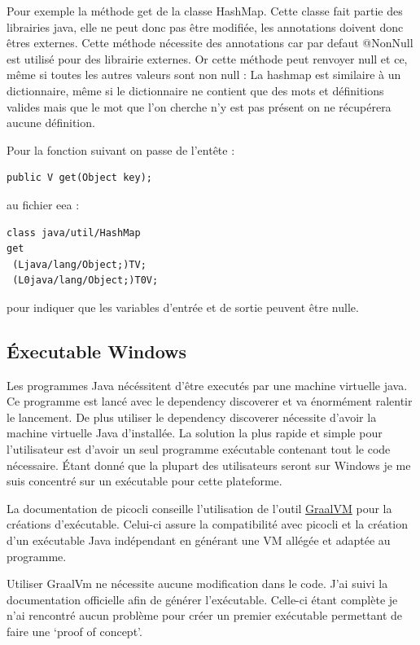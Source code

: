 \documentclass[french,a4paper,12pt]{report}
\begin{document}
Pour exemple la méthode get de la classe HashMap. Cette classe fait partie des librairies java, elle ne peut donc pas être modifiée, les annotations doivent donc êtres externes. Cette méthode nécessite des annotations car par defaut @NonNull est utilisé pour des librairie externes. Or cette méthode peut renvoyer null et ce, même si toutes les autres valeurs sont non null : La hashmap est similaire à un dictionnaire, même si le dictionnaire ne contient que des mots et définitions valides mais que le mot que l'on cherche n'y est pas présent on ne récupérera aucune définition.

Pour la fonction suivant on passe de l’entête :
\begin{lstlisting}
public V get(Object key);
\end{lstlisting}

au fichier eea :

\begin{verbatim}
class java/util/HashMap
get
 (Ljava/lang/Object;)TV;
 (L0java/lang/Object;)T0V;
\end{verbatim}

pour indiquer que les variables d'entrée et de sortie peuvent être nulle.

\subsection{Éxecutable Windows}

Les programmes Java nécéssitent d’être executés par une machine virtuelle java. Ce programme est lancé avec le dependency discoverer et va énormément ralentir le lancement. De plus utiliser le dependency discoverer nécessite d’avoir la machine virtuelle Java d’installée. La solution la plus rapide et simple pour l’utilisateur est d’avoir un seul programme exécutable contenant tout le code nécessaire. Étant donné que la plupart des utilisateurs seront sur Windows je me suis concentré sur un exécutable pour cette plateforme.

La documentation de picocli conseille l’utilisation de l’outil \href{https://www.graalvm.org/}{GraalVM} pour la créations d’exécutable. Celui-ci assure la compatibilité avec picocli et la création d’un exécutable Java indépendant en générant une VM allégée et adaptée au programme. 

Utiliser GraalVm ne nécessite aucune modification dans le code. J’ai suivi la documentation officielle afin de générer l’exécutable. Celle-ci étant complète je n’ai rencontré aucun problème pour créer un premier exécutable permettant de faire une ‘proof of concept’.
\end{document}
